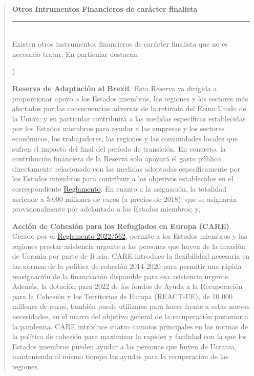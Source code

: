 \documentclass[10pt,a4paper]{article}
\newcounter{alphaitem}
\newenvironment{la}
      {\begin{list}{\alph{alphaitem})}{%
          \usecounter{alphaitem}%
          \setlength{\leftmargin}{1cm}%
          \setlength{\parskip}{3pt}%
          \setlength{\itemsep}{0pt}%
          \setlength{\parsep}{0pt}%
      }}
      {\end{list}}
\newenvironment{specialblock}[1]{%
      \begin{quote} %
      \small %
      \noindent\textbf{#1}\\[-0.3em] %
      \rule{\linewidth}{0.4pt}\\[0.6em]}{
      \end{quote}}
\begin{document}
\begin{specialblock}{Otros Intrumentos Financieros de carácter finalista}
    Existen otros instrumentos financieros de carácter finalista que no es necesario tratar. En particular destacan:
    \begin{la}
        \item \textbf{Reserva de Adaptación al Brexit}. Esta Reserva va dirigida a proporcionar apoyo a los Estados miembros, las regiones y los sectores más afectados por las consecuencias adversas de la retirada del Reino Unido de la Unión; y en particular contribuirá a las medidas específicas establecidas por los Estados miembros para ayudar a las empresas y los sectores económicos, los trabajadores, las regiones y las comunidades locales que sufren el impacto del final del período de transición. En concreto. la contribución financiera de la Reserva solo apoyará el gasto público directamente relacionado con las medidas adoptadas específicamente por los Estados miembros para contribuir a los objetivos establecidos en el correspondiente \href{https://eur-lex.europa.eu/eli/reg/2021/1755/oj/spa}{Reglamento}. En cuanto a la asignación, la totalidad asciende a 5.000 millones de euros (a precios de 2018), que se asignarán provisionalmente por adelantado a los Estados miembros; y,
        \item \textbf{Acción de Cohesión para los Refugiados en Europa (CARE)}. Creado por el \href{https://www.boe.es/buscar/doc.php?id=DOUE-L-2022-80558}{Reglamento 2022/562}, permite a los Estados miembros y las regiones prestar asistencia urgente a las personas que huyen de la invasión de Ucrania por parte de Rusia. CARE introduce la flexibilidad necesaria en las normas de la política de cohesión 2014-2020 para permitir una rápida reasignación de la financiación disponible para esa asistencia urgente. Además, la dotación para 2022 de los fondos de Ayuda a la Recuperación para la Cohesión y los Territorios de Europa (REACT-UE), de 10 000 millones de euros, también puede utilizarse para hacer frente a estas nuevas necesidades, en el marco del objetivo general de la recuperación posterior a la pandemia. CARE introduce cuatro camoios principales en las normas de la política de cohesión para maximizar la rapidez y facilidad con la que los Estados miembros pueden ayudar a las personas que huyen de Ucrania, manteniendo al mismo tiempo las ayudas para la recuperación de las regiones.
    \end{la}
\end{specialblock}
\end{document}
